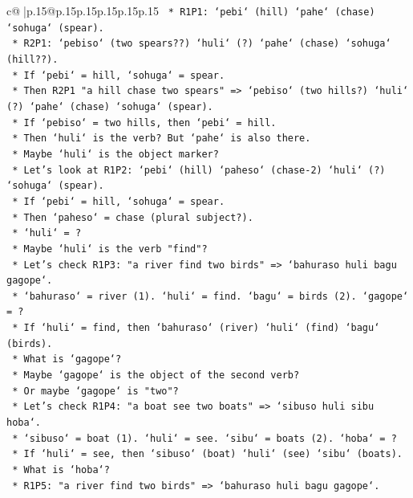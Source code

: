 \documentclass{article}
\begin{document}
{\begin{supertabular}{c@{$\;$}|p{.15\linewidth}@{}p{.15\linewidth}p{.15\linewidth}p{.15\linewidth}p{.15\linewidth}p{.15\linewidth}}
{{{\texttt{        *   R1P1: `pebi` (hill) `pahe` (chase) `sohuga` (spear).} \\
\texttt{        *   R2P1: `pebiso` (two spears??) `huli` (?) `pahe` (chase) `sohuga` (hill??).} \\
\texttt{        *   If `pebi` = hill, `sohuga` = spear.} \\
\texttt{        *   Then R2P1 "a hill chase two spears" => `pebiso` (two hills?) `huli` (?) `pahe` (chase) `sohuga` (spear).} \\
\texttt{        *   If `pebiso` = two hills, then `pebi` = hill.} \\
\texttt{        *   Then `huli` is the verb? But `pahe` is also there.} \\
\texttt{        *   Maybe `huli` is the object marker?} \\
\texttt{        *   Let's look at R1P2: `pebi` (hill) `paheso` (chase{-}2) `huli` (?) `sohuga` (spear).} \\
\texttt{        *   If `pebi` = hill, `sohuga` = spear.} \\
\texttt{        *   Then `paheso` = chase (plural subject?).} \\
\texttt{        *   `huli` = ?} \\
\texttt{        *   Maybe `huli` is the verb "find"?} \\
\texttt{        *   Let's check R1P3: "a river find two birds" => `bahuraso huli bagu gagope`.} \\
\texttt{            *   `bahuraso` = river (1). `huli` = find. `bagu` = birds (2). `gagope` = ?} \\
\texttt{            *   If `huli` = find, then `bahuraso` (river) `huli` (find) `bagu` (birds).} \\
\texttt{            *   What is `gagope`?} \\
\texttt{            *   Maybe `gagope` is the object of the second verb?} \\
\texttt{            *   Or maybe `gagope` is "two"?} \\
\texttt{            *   Let's check R1P4: "a boat see two boats" => `sibuso huli sibu hoba`.} \\
\texttt{                *   `sibuso` = boat (1). `huli` = see. `sibu` = boats (2). `hoba` = ?} \\
\texttt{                *   If `huli` = see, then `sibuso` (boat) `huli` (see) `sibu` (boats).} \\
\texttt{                *   What is `hoba`?} \\
\texttt{            *   R1P5: "a river find two birds" => `bahuraso huli bagu gagope`.} \\
}}}
\end{supertabular}}
\end{document}
